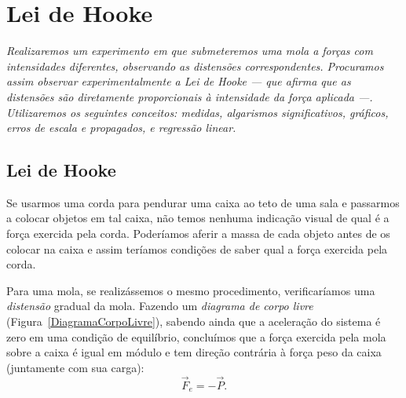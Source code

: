 \chapter{Lei de Hooke}
\label{Chap:ExpLeiDeHooke}

\begin{fullwidth}\it
	Realizaremos um experimento em que submeteremos uma mola a forças com intensidades diferentes, observando as distensões correspondentes. Procuramos assim observar experimentalmente a Lei de Hooke --- que afirma que as distensões são diretamente proporcionais à intensidade da força aplicada ---. Utilizaremos os seguintes conceitos: medidas, algarismos significativos, gráficos, erros de escala e propagados, e regressão linear.
\end{fullwidth}

\section{Lei de Hooke}

Se usarmos uma corda para pendurar uma caixa ao teto de uma sala e passarmos a colocar objetos em tal caixa, não temos nenhuma indicação visual de qual é a força exercida pela corda. Poderíamos aferir a massa de cada objeto antes de os colocar na caixa e assim teríamos condições de saber qual a força exercida pela corda.

Para uma mola, se realizássemos o mesmo procedimento, verificaríamos uma \emph{distensão} gradual da mola. Fazendo um \emph{diagrama de corpo livre} (Figura~\ref{DiagramaCorpoLivre}), sabendo ainda que a aceleração do sistema é zero em uma condição de equilíbrio, concluímos que a força exercida pela mola sobre a caixa é igual em módulo e tem direção contrária à força peso da caixa (juntamente com sua carga):
\begin{equation}
	\vec{F}_e = -\vec{P}.
\end{equation}

